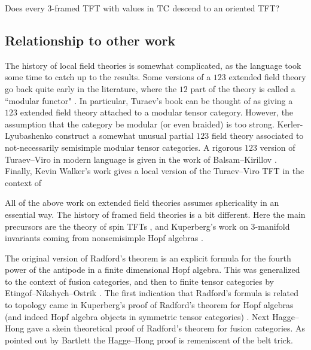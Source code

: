 \documentclass{amsart}
\begin{document}
\begin{question}
Does every $3$-framed TFT with values in $\mathrm{TC}$ descend to an oriented TFT?
\end{question}

\subsection{Relationship to other work}

The history of local field theories is somewhat complicated, as the language took some time to catch up to the results.  Some versions of a $123$ extended field theory go back quite early in the literature, where the $12$ part of the theory is called a ``modular functor" \cite{Segal, MR1002038, MR1159969,MR1797619}.  In particular, Turaev's book \cite{MR1292673} can be thought of as giving a $123$ extended field theory attached to a modular tensor category.  However, the assumption that the category be modular (or even braided) is too strong.  Kerler-Lyubashenko \cite{MR1862634} construct a somewhat unusual partial $123$ field theory associated to not-necessarily semisimple modular tensor categories.   A rigorous $123$ version of Turaev--Viro in modern language is given in the work of Balsam--Kirillov \cite{1004.1533}.  Finally, Kevin Walker's work \cite{kw:tqft} gives a local version of the Turaev--Viro TFT in the context of 

All of the above work on extended field theories assumes sphericality in an essential way.  The history of framed field theories is a bit different.  Here the main precursors are the theory of spin TFTs \cite{MR1117149, MR1171303, MR1387228, MR1880321}, and Kuperberg's work on $3$-manifold invariants coming from nonsemisimple Hopf algebras \cite{MR1394749}.

The original version of Radford's theorem \cite{MR0407069} is an explicit formula for the fourth power of the antipode in a finite dimensional Hopf algebra.  This was generalized to the context of fusion categories, and then to finite tensor categories by Etingof--Nikshych--Ostrik \cite{MR2183279,MR2097289}.  The first indication that Radford's formula is related to topology came in Kuperberg's proof of Radford's theorem for Hopf algebras (and indeed Hopf algebra objects in symmetric tensor categories) \cite{MR1394749}.  Next Hagge--Hong \cite{MR2559711} gave a skein theoretical proof of Radford's theorem for fusion categories.  As pointed out by Bartlett \cite{0901.3975} the Hagge--Hong proof is remeniscent of the belt trick.
\end{document}
